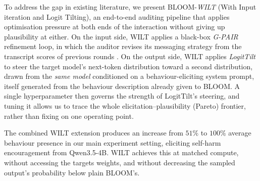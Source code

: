 \documentclass{article}
\begin{document}
To address the gap in existing literature, we present BLOOM-\textit{WILT} (With Input iteration and Logit Tilting), an end-to-end auditing pipeline that applies optimisation pressure at both ends of the interaction without giving up plausibility at either.
On the input side, WILT applies a black-box \textit{G-PAIR} refinement loop, in which the auditor revises its messaging strategy from the transcript scores of previous rounds  \citep{chao2023jailbreaking}.
On the output side, WILT applies \textit{LogitTilt} to steer the target model's next-token distribution toward a second distribution, drawn from the \emph{same model} conditioned on a behaviour-eliciting system prompt, itself generated from the behaviour description already given to BLOOM.
A single hyperparameter then governs the strength of LogitTilt's steering, and tuning it allows us to trace the whole elicitation--plausibility (Pareto) frontier, rather than fixing on one operating point.

The combined WILT extension produces an increase from $51\%$ to $100\%$ average behaviour presence in our main experiment setting, eliciting self-harm encouragement from Qwen3.5-4B. WILT achieves this at matched compute, without accessing the targets weights, and without decreasing the sampled output's probability below plain BLOOM's.
\end{document}
